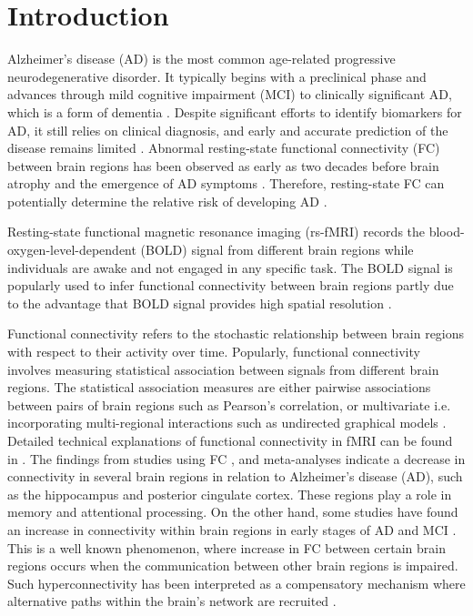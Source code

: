 \documentclass[12pt,reqno]{amsart}
\theoremstyle{definition}
\begin{document}
\section{Introduction}
Alzheimer's disease (AD) is the most common age-related progressive neurodegenerative disorder. It typically begins with a preclinical phase and advances through mild cognitive impairment (MCI) to clinically significant AD, which is a form of dementia \citep{querfurth2010alzheimer}. Despite significant efforts to identify biomarkers for AD, it still relies on clinical diagnosis, and early and accurate prediction of the disease remains limited \citep{laske2015innovative, li2019deep}. Abnormal resting-state functional connectivity (FC) between brain regions has been observed as early as two decades before brain atrophy and the emergence of AD symptoms \citep{ashraf2015cortical,nakamura2017early}. Therefore, resting-state FC can potentially determine the relative risk of developing AD \citep{brier2014functional,sheline2013resting}.

Resting-state functional magnetic resonance imaging (rs-fMRI) records the blood-oxygen-level-dependent (BOLD) signal from different brain regions while individuals are awake and not engaged in any specific task. The BOLD signal is popularly used to infer functional connectivity between brain regions partly due to the advantage that BOLD signal provides high spatial resolution \citep{yamasaki2012understanding,sporns2013human,liu2015multimodal,xue2019distinct}.

Functional connectivity refers to the stochastic relationship between brain regions with respect to their activity over time. Popularly, functional connectivity involves measuring statistical association between signals from different brain regions. The statistical association measures are either pairwise associations between pairs of brain regions such as Pearson's correlation, or multivariate i.e. incorporating multi-regional interactions such as undirected graphical models \citep{biswas2021statistical}. Detailed technical explanations of functional connectivity in fMRI can be found in \citet{chen2017methods,keilholz2017time,scarapicchia2018resting}. The findings from studies using FC \citep{wang2007altered,kim2016distinctive}, and meta-analyses \citep{jacobs2013meta,li2015toward,badhwar2017resting} indicate a decrease in connectivity in several brain regions in relation to Alzheimer's disease (AD), such as the hippocampus and posterior cingulate cortex. These regions play a role in memory and attentional processing. On the other hand, some studies have found an increase in connectivity within brain regions in early stages of AD and MCI \citep{gour2014functional,bozzali2015impact, hillary2017injured}. This is a well known phenomenon, where increase in FC between certain brain regions occurs when the communication between other brain regions is impaired. Such hyperconnectivity has been interpreted as a compensatory mechanism where alternative paths within the brain's network are recruited \citep{hillary2017injured,marek2022frontoparietal,oldham2019development}. 
\end{document}
